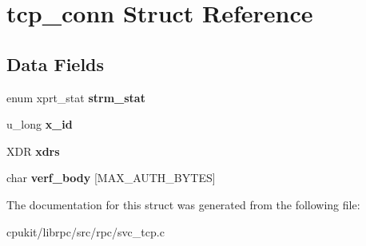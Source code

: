 \hypertarget{structtcp__conn}{}\section{tcp\+\_\+conn Struct Reference}
\label{structtcp__conn}
\subsection*{Data Fields}
\begin{DoxyCompactItemize}
\item 
\mbox{\label{structtcp__conn_abb3a69238ecaebce9aebb735681c0fe7}} 
enum xprt\+\_\+stat {\bfseries strm\+\_\+stat}
\item 
\mbox{\label{structtcp__conn_a12a899d89f7156954fae4cf94bb16f2e}} 
u\+\_\+long {\bfseries x\+\_\+id}
\item 
\mbox{\label{structtcp__conn_afeeaf8f16f5c71970e87d224d19c06f1}} 
X\+DR {\bfseries xdrs}
\item 
\mbox{\label{structtcp__conn_a580ca819bb762ee69dcf0426a8544d07}} 
char {\bfseries verf\+\_\+body} \mbox{[}M\+A\+X\+\_\+\+A\+U\+T\+H\+\_\+\+B\+Y\+T\+ES\mbox{]}
\end{DoxyCompactItemize}


The documentation for this struct was generated from the following file\+:\begin{DoxyCompactItemize}
\item 
cpukit/librpc/src/rpc/svc\+\_\+tcp.\+c\end{DoxyCompactItemize}

